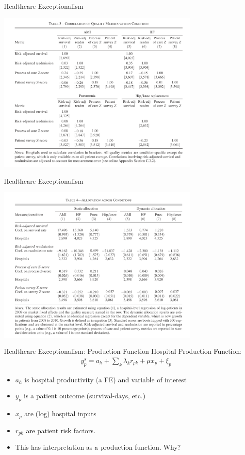 \documentclass[aspectratio=169]{beamer}
\begin{document}
\begin{frame}{Healthcare Exceptionalism}
\begin{center}
\includegraphics[width=4in]{./resources/hc3.png}
\end{center}
\end{frame}

\begin{frame}{Healthcare Exceptionalism}
\begin{center}
\includegraphics[width=4in]{./resources/hc4.png}
\end{center}
\end{frame}


\begin{frame}{Healthcare Exceptionalism: Production Function}
Hospital Production Function:
\begin{align*}
y_{p}^{s}=a_{h}+\sum_{k} \lambda_{k} r_{p k}+\mu x_{p}+\xi_{p}
\end{align*}
\begin{itemize}
\item $a_h$ is \alert{hospital productivity} (a FE) and variable of interest
\item $y_p$ is a patient outcome (survival-days, etc.)
\item $x_p$ are (log) hospital inputs
\item $r_{pk}$ are patient risk factors.
\item This has interpretation as a \alert{production function}. Why?
\end{itemize}
\end{frame}
\end{document}
